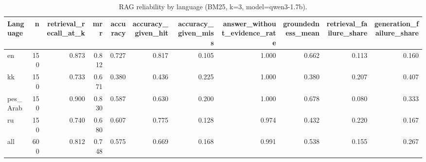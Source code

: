 \begin{table}[t]
\centering
\small
\caption{RAG reliability by language (BM25, k=3, model=qwen3-1.7b).}
\label{tab:rag_reliability}
\begin{tabular}{lrrrrrrrrrr}
\toprule
Language & n & retrieval\_recall\_at\_k & mrr & accuracy & accuracy\_given\_hit & accuracy\_given\_miss & answer\_without\_evidence\_rate & groundedness\_mean & retrieval\_failure\_share & generation\_failure\_share \\
\midrule
en & 150 & 0.873 & 0.812 & 0.727 & 0.817 & 0.105 & 1.000 & 0.662 & 0.113 & 0.160 \\
kk & 150 & 0.733 & 0.671 & 0.380 & 0.436 & 0.225 & 1.000 & 0.380 & 0.207 & 0.407 \\
pes\_Arab & 150 & 0.900 & 0.830 & 0.587 & 0.630 & 0.200 & 1.000 & 0.678 & 0.080 & 0.333 \\
ru & 150 & 0.740 & 0.680 & 0.607 & 0.775 & 0.128 & 0.974 & 0.432 & 0.220 & 0.167 \\
all & 600 & 0.812 & 0.748 & 0.575 & 0.669 & 0.168 & 0.991 & 0.538 & 0.155 & 0.267 \\
\bottomrule
\end{tabular}
\end{table}
